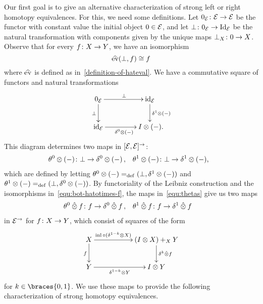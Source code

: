 \documentclass[reqno,10pt,a4paper,oneside,draft]{amsart}
\begin{document}
Our first goal is to give an alternative characterization of strong left or right homotopy equivalences.
For this, we need some definitions.
Let $0_{\mathcal{E}} \colon \mathcal{E} \to \mathcal{E}$ be the functor with constant value the initial object $0 \in \mathcal{E}$, and let $\bot \colon 0_{\mathcal{E}} \rightarrow \operatorname{Id}_{\mathcal{E}}$ be the natural transformation with components given by the unique maps $\bot_X \colon 0 \to X$.
Observe that for every $f \colon X \to Y$, we have an isomorphism
\begin{equation}
\label{equ:bot-hatotimes-f}
\widehat{\operatorname{ev}}(\bot, f) \cong f
\end{equation}
where $\widehat{\operatorname{ev}}$ is defined as in~\eqref{definition-of-hateval}.
We have a commutative square of functors and natural transformations
\begin{equation} \label{the-trivial-square}
\begin{gathered}
\xymatrix@C+2em{
  0_\catE
  \ar[r]^{\bot}
  \ar[d]_{\bot}
&
  \id_\catE
  \ar[d]^{\rcyl \otimes (-)}
\\
  \id_\catE
  \ar[r]_{\lcyl \otimes (-)}
&
  \interval \otimes (-)
\rlap{.}}
\end{gathered}
\end{equation}
This diagram determines two maps in $[\mathcal{E}, \mathcal{E}]^\to$:
\begin{equation} \label{equ:thetas}
\begin{aligned}
  \thetal \otimes (-) &\co \bot \rightarrow \lcyl \otimes (-)
\, ,&
  \thetar \otimes (-) &\co \bot \rightarrow \rcyl \otimes (-)
\rlap{,}
\end{aligned}
\end{equation}
which are defined by letting $\theta^0 \otimes (-) =_{\operatorname{def}} (\bot, \delta^1 \otimes (-))$ and $\theta^1 \otimes (-) =_{\operatorname{def}} (\bot, \delta^0 \otimes (-))$.
By functoriality of the Leibniz construction and the isomorphisms in~\eqref{equ:bot-hatotimes-f}, the maps in~\eqref{equ:thetas} give us two maps
\begin{equation*}
\begin{aligned}
  \theta^0 \mathbin{\hat{\otimes}} f &\colon f \to \delta^0 \mathbin{\hat{\otimes}} f
\, ,&
  \theta^1 \mathbin{\hat{\otimes}} f &\colon f \to \delta^1 \mathbin{\hat{\otimes}} f
\end{aligned}
\end{equation*}
in $\mathcal{E}^\to$ for $f \colon X \to Y$, which consist of squares of the form
\[
\xymatrix@C+3em{
  X
  \ar[r]^-{\inl \cc (\kcylinv \otimes X)}
  \ar[d]_{f}
&
  (\interval \otimes X) +_X Y \ar[d]^{\kcyl \hatotimes f}
\\
  Y
  \ar[r]_-{\kcylinv \otimes Y}
&
  \interval \otimes Y
}
\]
for $k \in \braces{0, 1}$.
We use these maps to provide the following characterization of strong homotopy equivalences.
\end{document}

